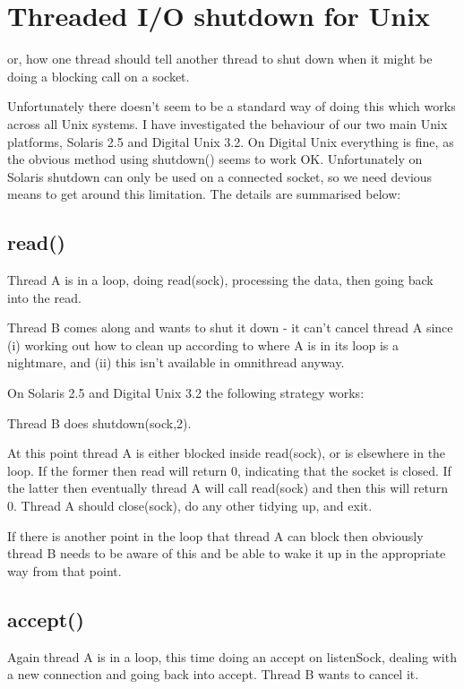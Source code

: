 \documentclass[11pt,twoside,onecolumn]{article}
\begin{document}
\section{Threaded I/O shutdown for Unix}

or, how one thread should tell another thread to shut down when it might
be doing a blocking call on a socket.

Unfortunately there doesn't seem to be a standard way of doing this which works
across all Unix systems.  I have investigated the behaviour of our two main
Unix platforms, Solaris 2.5 and Digital Unix 3.2.  On Digital Unix everything
is fine, as the obvious method using shutdown() seems to work OK.
Unfortunately on Solaris shutdown can only be used on a connected socket, so we
need devious means to get around this limitation.  The details are summarised
below:


\subsection{read()}

Thread A is in a loop, doing read(sock), processing the data, then going back
into the read.

Thread B comes along and wants to shut it down - it can't cancel thread A since
(i) working out how to clean up according to where A is in its loop is a
nightmare, and (ii) this isn't available in omnithread anyway.

On Solaris 2.5 and Digital Unix 3.2 the following strategy works:

Thread B does shutdown(sock,2).

At this point thread A is either blocked inside read(sock), or is elsewhere in
the loop.  If the former then read will return 0, indicating that the socket is
closed.  If the latter then eventually thread A will call read(sock) and then
this will return 0.  Thread A should close(sock), do any other tidying up, and
exit.

If there is another point in the loop that thread A can block then obviously
thread B needs to be aware of this and be able to wake it up in the appropriate
way from that point.



\subsection{accept()}

Again thread A is in a loop, this time doing an accept on listenSock, dealing
with a new connection and going back into accept.  Thread B wants to cancel it.
\end{document}
